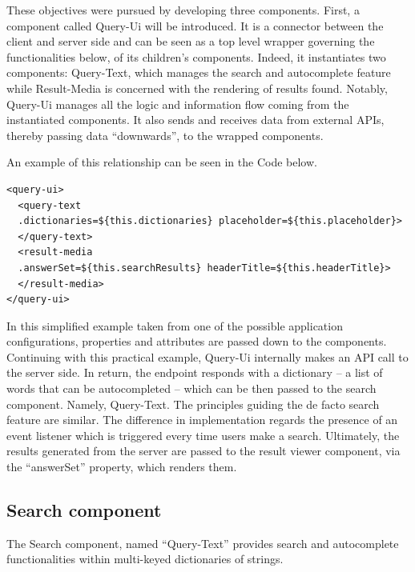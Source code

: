 These objectives were pursued by developing three components. First, a component called Query-Ui will be introduced. It is a connector between the client and server side and can be seen as a top level wrapper governing the functionalities below, of its children’s components. Indeed, it instantiates two components: Query-Text, which manages the search and autocomplete feature while Result-Media is concerned with the rendering of results found.
Notably, Query-Ui manages all the logic and information flow coming from the instantiated components. It also sends and receives data from external APIs, thereby passing data “downwards”, to the wrapped components.

An example of this relationship can be seen in the Code below.
\\
\begin{lstlisting}[caption={Query-Ui component instantiation},label={queryUi}, language=HTML5]
<query-ui>
  <query-text 
  .dictionaries=${this.dictionaries} placeholder=${this.placeholder}>
  </query-text>
  <result-media 
  .answerSet=${this.searchResults} headerTitle=${this.headerTitle}>
  </result-media>
</query-ui>
\end{lstlisting}

In this simplified example taken from one of the possible application configurations, properties and attributes are passed down to the components. Continuing with this practical example, Query-Ui internally makes an API call to the server side. In return, the endpoint responds with a dictionary – a list of words that can be autocompleted – which can be then passed to the search component. Namely, Query-Text. The principles guiding the de facto search feature are similar. The difference in implementation regards the presence of an event listener which is triggered every time users make a search. Ultimately, the results generated from the server are passed to the result viewer component, via the “answerSet” property, which renders them.

\subsection{Search component}
\label{subsec:searchComponents}

The Search component, named “Query-Text” provides search and autocomplete functionalities within multi-keyed dictionaries of strings.

